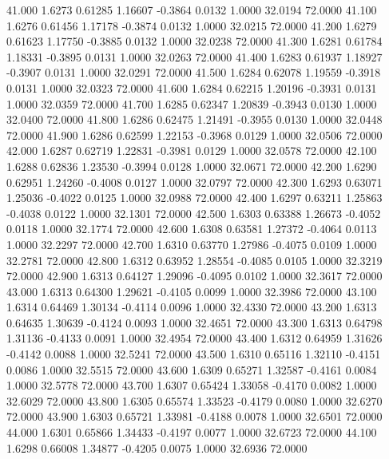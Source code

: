   41.000   1.6273   0.61285   1.16607  -0.3864   0.0132   1.0000  32.0194  72.0000
  41.100   1.6276   0.61456   1.17178  -0.3874   0.0132   1.0000  32.0215  72.0000
  41.200   1.6279   0.61623   1.17750  -0.3885   0.0132   1.0000  32.0238  72.0000
  41.300   1.6281   0.61784   1.18331  -0.3895   0.0131   1.0000  32.0263  72.0000
  41.400   1.6283   0.61937   1.18927  -0.3907   0.0131   1.0000  32.0291  72.0000
  41.500   1.6284   0.62078   1.19559  -0.3918   0.0131   1.0000  32.0323  72.0000
  41.600   1.6284   0.62215   1.20196  -0.3931   0.0131   1.0000  32.0359  72.0000
  41.700   1.6285   0.62347   1.20839  -0.3943   0.0130   1.0000  32.0400  72.0000
  41.800   1.6286   0.62475   1.21491  -0.3955   0.0130   1.0000  32.0448  72.0000
  41.900   1.6286   0.62599   1.22153  -0.3968   0.0129   1.0000  32.0506  72.0000
  42.000   1.6287   0.62719   1.22831  -0.3981   0.0129   1.0000  32.0578  72.0000
  42.100   1.6288   0.62836   1.23530  -0.3994   0.0128   1.0000  32.0671  72.0000
  42.200   1.6290   0.62951   1.24260  -0.4008   0.0127   1.0000  32.0797  72.0000
  42.300   1.6293   0.63071   1.25036  -0.4022   0.0125   1.0000  32.0988  72.0000
  42.400   1.6297   0.63211   1.25863  -0.4038   0.0122   1.0000  32.1301  72.0000
  42.500   1.6303   0.63388   1.26673  -0.4052   0.0118   1.0000  32.1774  72.0000
  42.600   1.6308   0.63581   1.27372  -0.4064   0.0113   1.0000  32.2297  72.0000
  42.700   1.6310   0.63770   1.27986  -0.4075   0.0109   1.0000  32.2781  72.0000
  42.800   1.6312   0.63952   1.28554  -0.4085   0.0105   1.0000  32.3219  72.0000
  42.900   1.6313   0.64127   1.29096  -0.4095   0.0102   1.0000  32.3617  72.0000
  43.000   1.6313   0.64300   1.29621  -0.4105   0.0099   1.0000  32.3986  72.0000
  43.100   1.6314   0.64469   1.30134  -0.4114   0.0096   1.0000  32.4330  72.0000
  43.200   1.6313   0.64635   1.30639  -0.4124   0.0093   1.0000  32.4651  72.0000
  43.300   1.6313   0.64798   1.31136  -0.4133   0.0091   1.0000  32.4954  72.0000
  43.400   1.6312   0.64959   1.31626  -0.4142   0.0088   1.0000  32.5241  72.0000
  43.500   1.6310   0.65116   1.32110  -0.4151   0.0086   1.0000  32.5515  72.0000
  43.600   1.6309   0.65271   1.32587  -0.4161   0.0084   1.0000  32.5778  72.0000
  43.700   1.6307   0.65424   1.33058  -0.4170   0.0082   1.0000  32.6029  72.0000
  43.800   1.6305   0.65574   1.33523  -0.4179   0.0080   1.0000  32.6270  72.0000
  43.900   1.6303   0.65721   1.33981  -0.4188   0.0078   1.0000  32.6501  72.0000
  44.000   1.6301   0.65866   1.34433  -0.4197   0.0077   1.0000  32.6723  72.0000
  44.100   1.6298   0.66008   1.34877  -0.4205   0.0075   1.0000  32.6936  72.0000
